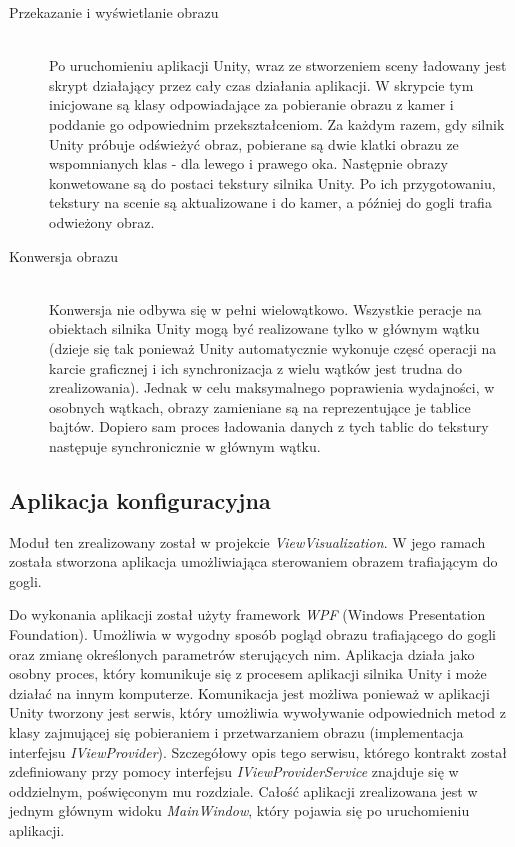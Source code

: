 \documentclass[a4paper,11pt,twoside]{report}
\theoremstyle{definition}
\begin{document}
\begin{description}
\item [Przekazanie i wyświetlanie obrazu] \hfill \\
Po uruchomieniu aplikacji Unity, wraz ze stworzeniem sceny ładowany jest skrypt działający przez cały czas działania aplikacji. W skrypcie tym inicjowane  są klasy odpowiadające za pobieranie obrazu z kamer i poddanie go odpowiednim przekształceniom. Za każdym razem, gdy silnik Unity próbuje odświeżyć obraz, pobierane są dwie klatki obrazu ze wspomnianych klas - dla lewego i prawego oka. Następnie obrazy konwetowane są do postaci tekstury silnika Unity. Po ich przygotowaniu, tekstury na scenie są aktualizowane i do kamer, a później do gogli trafia odwieżony obraz.
\item [Konwersja obrazu] \hfill \\
Konwersja nie odbywa się w pełni wielowątkowo. Wszystkie peracje na obiektach silnika Unity mogą być realizowane tylko w głównym wątku (dzieje się tak ponieważ Unity automatycznie wykonuje częsć operacji na karcie graficznej i ich synchronizacja z wielu wątków jest trudna do zrealizowania). Jednak w celu maksymalnego poprawienia wydajności, w osobnych wątkach, obrazy zamieniane są na reprezentujące je tablice bajtów. Dopiero sam proces ładowania danych z tych tablic do tekstury następuje synchronicznie w głównym wątku. 
\end{description}

\subsection{Aplikacja konfiguracyjna}

Moduł ten zrealizowany został w projekcie \textit{ViewVisualization}. W jego ramach została stworzona aplikacja umożliwiająca sterowaniem obrazem trafiającym do gogli.

Do wykonania aplikacji został użyty framework \textit{WPF} (Windows Presentation Foundation). Umożliwia w wygodny sposób pogląd obrazu trafiającego do gogli oraz zmianę określonych parametrów sterujących nim. Aplikacja działa jako osobny proces, który komunikuje się z procesem aplikacji silnika Unity i może działać na innym komputerze. Komunikacja jest możliwa ponieważ w aplikacji Unity tworzony jest serwis, który umożliwia wywoływanie odpowiednich metod z klasy zajmującej się pobieraniem i przetwarzaniem obrazu (implementacja interfejsu \textit{IViewProvider}). Szczegółowy opis tego serwisu, którego kontrakt został zdefiniowany przy pomocy interfejsu \textit{IViewProviderService} znajduje się w oddzielnym, poświęconym mu rozdziale. Całość aplikacji zrealizowana jest w jednym głównym widoku \textit{MainWindow}, który pojawia się po uruchomieniu aplikacji. 
\end{document}
